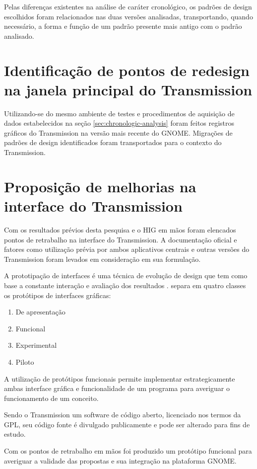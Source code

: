
Pelas diferenças existentes na análise de caráter cronológico, os padrões de
design escolhidos foram relacionados nas duas versões analisadas, transportando,
quando necessário, a forma e função de um padrão presente mais antigo com o
padrão analisado.

\section{Identificação de pontos de redesign na janela principal do Transmission}

Utilizando-se do mesmo ambiente de testes e procedimentos de aquisição de dados
estabelecidos na seção \ref{sec:chronologic-analysis} foram feitos registros
gráficos do Transmission na versão mais recente do GNOME. Migrações de padrões
de design identificados foram transportados para o contexto do Transmission.


\section{Proposição de melhorias na interface do Transmission}

Com os resultados prévios desta pesquisa e o HIG em mãos foram elencados pontos
de retrabalho na interface do Transmission. A documentação oficial e fatores
como utilização prévia por ambos aplicativos centrais e outras versões do
Transmission foram levados em consideração em sua formulação.

A prototipação de interfaces é uma técnica de evolução de design que tem como
base a constante interação e avaliação dos resultados \cite{de2009client}.
 separa em quatro classes os protótipos de
interfaces gráficas:

\begin{enumerate}
  \item De apresentação
  \item Funcional
  \item Experimental
  \item Piloto
\end{enumerate}

A utilização de protótipos funcionais permite implementar estrategicamente ambas
interface gráfica e funcionalidade de um programa para averiguar o funcionamento
de um conceito.

Sendo o Transmission um software de código aberto, licenciado nos termos da GPL,
seu código fonte é divulgado publicamente e pode ser alterado para fins de
estudo.

Com os pontos de retrabalho em mãos foi produzido um protótipo funcional para
averiguar a validade das propostas e sua integração na plataforma GNOME.
